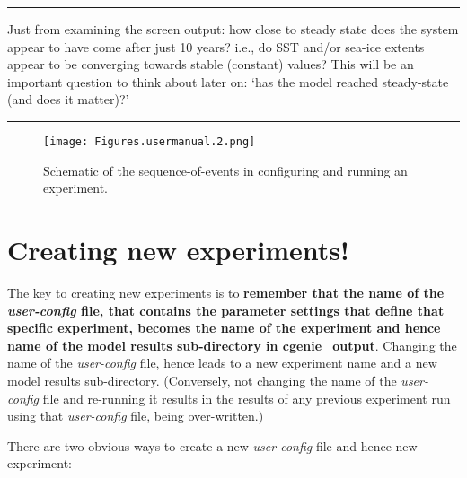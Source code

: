 \vspace{1mm}\noindent\rule{4cm}{0.5pt}\vspace{2mm}

\noindent Just from examining the screen output: how close to steady state does the system appear to have come after just 10 years? i.e., do SST and/or sea-ice extents appear to be converging towards stable (constant) values? This will be an important question to think about later on: ‘has the model reached steady-state (and does it matter)?’

\vspace{1mm}\noindent\rule{4cm}{0.5pt}\vspace{2mm}

\begin{figure}
\texttt{[image: Figures.usermanual.2.png]}\centering
\vspace{2mm}
\caption{Schematic of the sequence-of-events in configuring and running an experiment.}
\label{fig:chx-jobcreation}
\end{figure}

\newpage

\section{Creating new experiments!}

The key to creating new experiments is to \textbf{remember that the name of the \textit{user-config} file, that contains the parameter settings that define that specific experiment, becomes the name of the experiment and hence name of the model results sub-directory in \textsf{\footnotesize cgenie\_output}}. Changing the name of the \textit{user-config} file, hence leads to a new experiment name and a new model results sub-directory. (Conversely, not changing the name of the  \textit{user-config} file and re-running it results in the results of any previous experiment run using that \textit{user-config} file, being over-written.)

There are two obvious ways to create a new \textit{user-config} file and hence new experiment:

